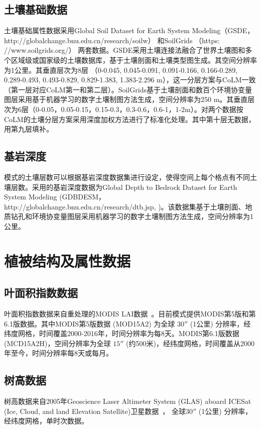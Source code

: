 \subsection{土壤基础数据}\label{土壤基础数据}
土壤基础属性数据采用Global Soil Dataset for Earth System Modeling（GSDE，http://globalchange.bnu.edu.cn/research/soilw） \citep{shangguan2014global}
和SoilGrids （https:\\//www.soilgrids.org/）\citep{poggio2021soilgrids} 两套数据。GSDE采用土壤连接法融合了世界土壤图和多个区域级或国家级的土壤数据库，基于土壤剖面和土壤类型图生成。其空间分辨率为1公里。其垂直层次为8层 （0-0.045, 0.045-0.091, 0.091-0.166, 0.166-0.289, 0.289-0.493, 0.493-0.829, 0.829-1.383, 1.383-2.296 m），这一分层方案与CoLM一致（第一层对应CoLM第一和第二层）。SoilGrids基于土壤剖面和数百个环境协变量图层采用基于机器学习的数字土壤制图方法生成，空间分辨率为250 m。其垂直层次为6层（0-0.05，0.05-0.15，0.15-0.3，0.3-0.6，0.6-1，1-2m）。对两个数据按CoLM的土壤分层方案采用深度加权方法进行了标准化处理。其中第十层无数据，用第九层填补。

\subsection{基岩深度}\label{基岩深度}

模式的土壤层数可以根据基岩深度数据集进行设定，使得空间上每个格点有不同土壤层数。采用的基岩深度数据为Global Depth to Bedrock Dataset for Earth System Modeling (GDBDESM，http://globalchange.bnu.edu.cn/research/dtb.jsp, \citet{shangguan2017mapping})。该数据集基于土壤剖面、地质钻孔和环境协变量图层采用机器学习的数字土壤制图方法生成，空间分辨率为1公里。


\section{植被结构及属性数据}\label{植被结构及属性数据}
\subsection{叶面积指数数据}\label{叶面积指数数据}
叶面积指数数据来自重处理的MODIS LAI数据~\citep{yuan20143d}。目前模式提供MODIS第5版和第6.1版数据。其中MODIS第5版数据 (MOD15A2) 为全球 $30''$ (1公里) 分辨率，经纬度网格，时间覆盖2000-2016年，时间分辨率为每8天。MODIS第6.1版数据 (MCD15A2H)，空间分辨率为全球 $15''$ (约500米)，经纬度网格，时间覆盖从2000年至今，时间分辨率每8天或每月。

\subsection{树高数据}\label{树高数据}
树高数据来自2005年Geoscience Laser Altimeter System (GLAS) aboard ICESat 
(Ice, Cloud, and land Elevation Satellite)卫星数据~\citep{simard2011mapping}，
全球$30''$ (1公里) 分辨率，经纬度网格，单时次数据。

